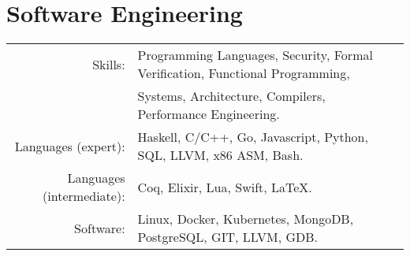 \documentclass[lettersize,10pt]{article}
\begin{document}
\section{Software Engineering}
\begin{tabular}{rl}
Skills:& Programming Languages, Security, Formal Verification, Functional Programming, \\
	   & Systems, Architecture, Compilers, Performance Engineering. \\
Languages (expert):& Haskell, C/C++, Go, Javascript, Python, SQL, LLVM, x86 ASM, Bash. \\
Languages (intermediate):& Coq, Elixir, Lua, Swift, \LaTeX. \\
Software:& Linux, Docker, Kubernetes, MongoDB, PostgreSQL, GIT, LLVM, GDB. \\
\end{tabular}


\end{document}
